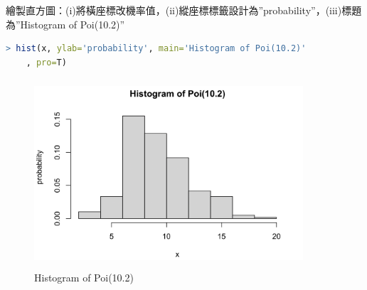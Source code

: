繪製直方圖：(i)將橫座標改機率值，(ii)縱座標標籤設計為”probability”，(iii)標題為”Histogram of Poi(10.2)”

\begin{lstlisting}[language=R]
> hist(x, ylab='probability', main='Histogram of Poi(10.2)'
    , pro=T)
\end{lstlisting}

\begin{figure}[h]
    \centering
    \includegraphics[width=10cm, height=7cm]{figures/Histogram.png}
    \caption{Histogram of Poi(10.2)}
    \label{fig:1}
\end{figure}
